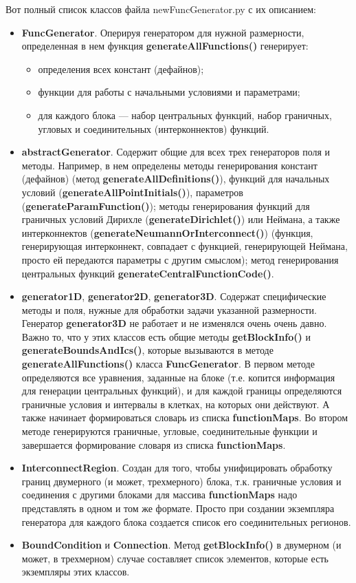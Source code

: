 \documentclass[a4paper]{article}
\begin{document}
Вот полный список классов файла newFuncGenerator.py с их описанием:
\begin{itemize}
\item {\bf FuncGenerator}. Оперируя генератором для нужной размерности, определенная в нем функция {\bf generateAllFunctions()} генерирует:
	\begin{itemize}
	\item определения всех констант (дефайнов);
	\item функции для работы с начальными условиями и параметрами;
	\item для каждого блока --- набор центральных функций, набор гра\-нич\-ных, угловых и соединительных (интерконнектов) функций.
	\end{itemize}
\item {\bf abstractGenerator}. Содержит общие для всех трех генераторов поля и методы. Например, в нем определены методы генерирования конст\-ант (дефайнов) (метод {\bf generateAllDefinitions()}), функций для на\-чаль\-ных условий ({\bf generateAllPointInitials()}), параметров ({\bf generateParamFunction()}); методы генерирования функций для гра\-нич\-ных условий Дирихле ({\bf generateDirichlet()}) или Неймана, а также интерконнектов ({\bf generateNeumannOrInterconnect()}) (функ\-ция, генерирующая интерконнект, совпадает с функцией, ге\-не\-ри\-ру\-ю\-щей Неймана, просто ей передаются параметры с другим смыслом); метод генерирования центральных функций {\bf generateCentralFunction\-Co\-de()}.
\item {\bf generator1D}, {\bf generator2D}, {\bf generator3D}. Содержат спе\-ци\-фи\-чес\-кие методы и поля, нужные для обработки задачи указанной раз\-мер\-нос\-ти. Генератор {\bf generator3D} не работает и не изменялся очень очень давно. Важно то, что у этих классов есть общие методы {\bf getBlockInfo()} и {\bf generateBoundsAndIcs()}, которые вызываются в  методе {\bf generateAllFunctions()} класса {\bf FuncGenerator}. В первом методе определяются все уравнения, заданные на блоке (т.е. копится информация для генерации центральных функций), и для каждой границы определяются граничные условия и интервалы в клетках, на которых они действуют. А также начинает формироваться словарь из списка {\bf functionMaps}. Во втором методе генерируются граничные, угловые, соединительные функции и завершается формирование сло\-ва\-ря из списка {\bf functionMaps}.
\item {\bf InterconnectRegion}. Создан для того, чтобы унифицировать об\-ра\-бот\-ку границ двумерного (и может, трехмерного) блока, т.к. гра\-нич\-ные условия и соединения с другими блоками для массива {\bf functionMaps} надо представлять в одном и том же формате. Просто при создании экземпляра генератора для каждого блока создается список его соединительных регионов.
\item {\bf BoundCondition} и {\bf Connection}. Метод {\bf getBlockInfo()} в двумерном (и может, в трехмерном) случае составляет список элементов, которые есть экземпляры этих классов.
\end{itemize}
\end{document}
